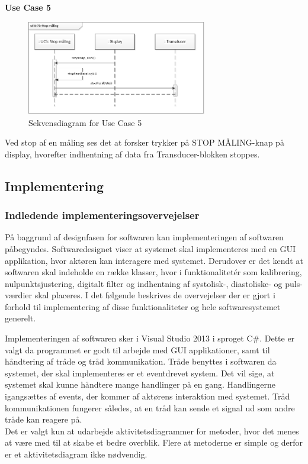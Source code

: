 \textbf{Use Case 5}
\begin{figure}[H]
	\centering
	\includegraphics[width=0.7\textwidth]{Figurer/UC5}
	\caption{Sekvensdiagram for Use Case 5}
	\label{fig:Sekvensdiagram_UC_5}
\end{figure}
Ved stop af en måling ses det at forsker trykker på STOP MÅLING-knap på display, hvorefter indhentning af data fra Transducer-blokken stoppes.

\subsection{Implementering}
\subsubsection{Indledende implementeringsovervejelser}
På baggrund af designfasen for softwaren kan implementeringen af softwaren påbegyndes. Softwaredesignet viser at systemet skal implementeres med en GUI applikation, hvor aktøren kan interagere med systemet. Derudover er det kendt at softwaren skal indeholde en række klasser, hvor i funktionalitetér som kalibrering, nulpunktsjustering, digitalt filter og indhentning af systolisk-, diastoliske- og puls-værdier skal placeres. I det følgende beskrives de overvejelser der er gjort i forhold til implementering af disse funktionaliteter og hele softwaresystemet generelt. 

Implementeringen af softwaren sker i Visual Studio 2013 i sproget C\#. Dette er valgt da programmet er godt til arbejde med GUI applikationer, samt til håndtering af tråde og tråd kommunikation. Tråde benyttes i softwaren da systemet, der skal implementeres er et eventdrevet system. Det vil sige, at systemet skal kunne håndtere mange handlinger på en gang. Handlingerne igangsættes af events, der kommer af aktørens interaktion med systemet. Tråd kommunikationen fungerer således, at en tråd kan sende et signal ud som andre tråde kan reagere på. \\
Det er valgt kun at udarbejde aktivitetsdiagrammer for metoder, hvor det menes at være med til at skabe et bedre overblik. Flere at metoderne er simple og derfor er et aktivitetsdiagram ikke nødvendig. 

